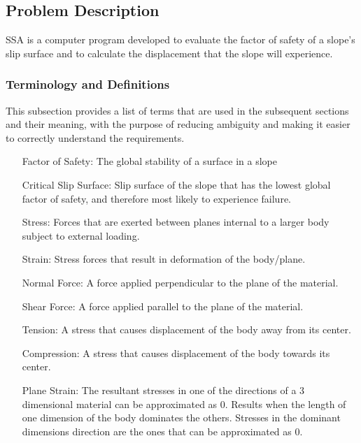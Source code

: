\documentclass[12pt]{article}
\begin{document}
\subsection{Problem Description}
\label{Sec:ProbDesc}
SSA is a computer program developed to evaluate the factor of safety of a slope's slip surface and to calculate the displacement that the slope will experience.
\subsubsection{Terminology and Definitions}
\label{Sec:TermDefs}
This subsection provides a list of terms that are used in the subsequent sections and their meaning, with the purpose of reducing ambiguity and making it easier to correctly understand the requirements.
\begin{itemize}
\item[Factor of Safety:]The global stability of a surface in a slope
\item[Critical Slip Surface:]Slip surface of the slope that has the lowest global factor of safety, and therefore most likely to experience failure.
\item[Stress:]Forces that are exerted between planes internal to a larger body subject to external loading.
\item[Strain:]Stress forces that result in deformation of the body/plane.
\item[Normal Force:]A force applied perpendicular to the plane of the material.
\item[Shear Force:]A force applied parallel to the plane of the material.
\item[Tension:]A stress that causes displacement of the body away from its center.
\item[Compression:]A stress that causes displacement of the body towards its center.
\item[Plane Strain:]The resultant stresses in one of the directions of a 3 dimensional material can be approximated as 0. Results when the length of one dimension of the body dominates the others. Stresses in the dominant dimensions direction are the ones that can be approximated as 0.
\end{itemize}
\end{document}
